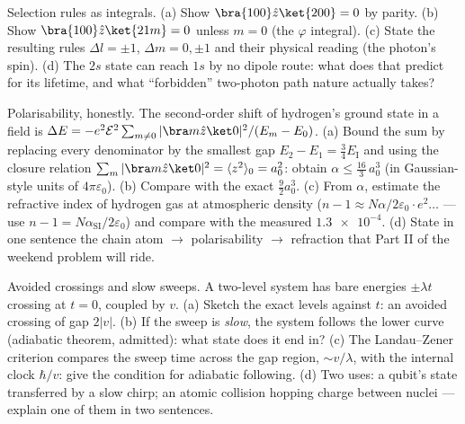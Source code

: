 \begin{exercise}[$\star\star$]\label{exo:b3:perturbation-theory:9}
Selection rules as integrals. (a) Show $\bra{100}\hat z\ket{200} =
0$ by parity. (b) Show $\bra{100}\hat z\ket{21m} = 0$ unless $m =
0$ (the $\varphi$ integral). (c) State the resulting rules $\Delta
l = \pm1$, $\Delta m = 0, \pm1$ and their physical reading (the
photon's spin). (d) The $2s$ state can reach $1s$ by no dipole
route: what does that predict for its lifetime, and what
``forbidden'' two-photon path nature actually takes?
\end{exercise}

\begin{exercise}[$\star\star\star$]\label{exo:b3:perturbation-theory:10}
Polarisability, honestly. The second-order shift of hydrogen's
ground state in a field is $\Delta E = -e^2\mathcal E^2\sum_{m\neq
0}|\bra m\hat z\ket 0|^2/(E_m - E_0)$. (a) Bound the sum by
replacing every denominator by the smallest gap $E_2 - E_1 =
\tfrac34 E_{\text{I}}$ and using the closure relation $\sum_m|\bra
m\hat z\ket0|^2 = \langle z^2\rangle_0 = a_0^2$: obtain $\alpha
\le \tfrac{16}3\,a_0^3$ (in Gaussian-style units of
$4\pi\varepsilon_0$). (b) Compare with the exact $\tfrac92 a_0^3$.
(c) From $\alpha$, estimate the refractive index of hydrogen gas
at atmospheric density ($n - 1 \approx N\alpha/2\varepsilon_0
\cdot e^2\dots$ --- use $n - 1 = N\alpha_{\text{SI}}/2
\varepsilon_0$) and compare with the measured $\num{1.3e-4}$.
(d) State in one sentence the chain atom $\to$ polarisability
$\to$ refraction that Part II of the weekend problem will ride.
\end{exercise}

\begin{exercise}[$\star\star\star$]\label{exo:b3:perturbation-theory:11}
Avoided crossings and slow sweeps. A two-level system has bare
energies $\pm\lambda t$ crossing at $t = 0$, coupled by $v$. (a)
Sketch the exact levels against $t$: an avoided crossing of gap
$2|v|$. (b) If the sweep is \emph{slow}, the system follows the
lower curve (adiabatic theorem, admitted): what state does it end
in? (c) The Landau--Zener criterion compares the sweep time
across the gap region, $\sim v/\lambda$, with the internal clock
$\hbar/v$: give the condition for adiabatic following. (d) Two
uses: a qubit's state transferred by a slow chirp; an atomic
collision hopping charge between nuclei --- explain one of them in
two sentences.
\end{exercise}

